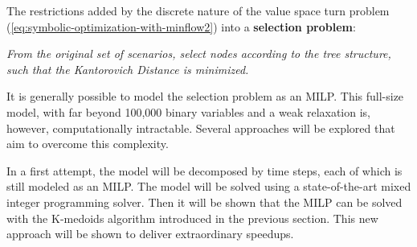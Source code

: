 The restrictions added by the discrete nature of the value space turn problem (\ref{eq:symbolic-optimization-with-minflow2}) into a \textbf{selection problem}:
\begin{center}
  \textit{From the original set of scenarios, select nodes according to the tree structure, such that the Kantorovich Distance is minimized.}
\end{center}
It is generally possible to model the selection problem as an MILP. 
This full-size model, with far beyond 100,000 binary variables and a weak relaxation is, however, computationally intractable.
Several approaches will be explored that aim to overcome this complexity.

In a first attempt, the model will be decomposed by time steps, each of which is still modeled as an MILP.
The model will be solved using a state-of-the-art mixed integer programming solver.
Then it will be shown that the MILP can be solved with the K-medoids algorithm introduced in the previous section. This new approach will be shown to deliver extraordinary speedups.

